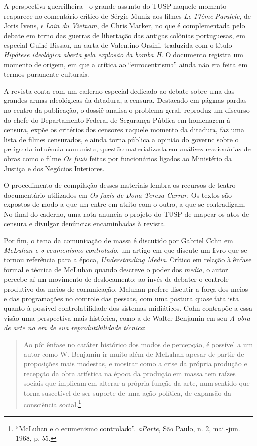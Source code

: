 A perspectiva guerrilheira - o grande assunto do TUSP naquele momento -
reaparece no comentário crítico de Sérgio Muniz aos filmes \textit{Le 17ème
Paralele}, de Joris Ivens, e \textit{Loin du Vietnam}, de Chris Marker, no
que é complementada pelo debate em torno das guerras de libertação das
antigas colônias portuguesas, em especial Guiné Bissau, na carta de
Valentino Orsini, traduzida com o título \textit{Hipótese ideológica aberta
pela explosão da bomba H}. O documento registra um momento de origem, em
que a crítica ao “eurocentrismo” ainda não era feita em termos puramente
culturais.

A revista conta com um caderno especial dedicado ao debate sobre uma das
grandes armas ideológicas da ditadura, a censura. Destacado em páginas
pardas no centro da publicação, o dossiê analisa o problema geral,
reproduz um discurso do chefe do Departamento Federal de Segurança
Pública em homenagem à censura, expõe os critérios dos censores naquele
momento da ditadura, faz uma lista de filmes censurados, e ainda torna
pública a opinião do governo sobre o perigo da influência comunista,
questão materializada em análises reacionárias de obras como o filme
\textit{Os fuzis} feitas por funcionários ligados ao Ministério da Justiça
e dos Negócios Interiores.

O procedimento de compilação desses materiais lembra os recursos de
teatro documentário utilizados em \textit{Os fuzis de Dona Tereza Carrar}.
Os textos são expostos de modo a que um entre em atrito com o outro, a
que se contradigam. No final do caderno, uma nota anuncia o projeto do
TUSP de mapear os atos de censura e divulgar denúncias encaminhadas à
revista.

Por fim, o tema da comunicação de massa é discutido por Gabriel Cohn em
\textit{McLuhan e o ecumenismo controlado}, um artigo em que discute um
livro que se tornou referência para a época, \textit{Understanding Media}.
Crítico em relação à ênfase formal e técnica de McLuhan quando descreve
o poder dos \textit{media}, o autor percebe aí um movimento de
deslocamento: ao invés de debater o controle produtivo dos meios de
comunicação, Mcluhan prefere discutir a força dos meios e das
programações no controle das pessoas, com uma postura quase fatalista
quanto à possível controlabilidade dos sistemas midiáticos. Cohn
contrapõe a essa visão uma perspectiva mais histórica, como a de Walter
Benjamin em seu \textit{A obra de arte na era de sua reprodutibilidade
técnica}:

\begin{quote}
Ao pôr ênfase no caráter histórico dos modos de percepção, é possível a
um autor como W. Benjamin ir muito além de McLuhan apesar de partir de
proposições mais modestas, e mostrar como a crise da própria produção e
recepção da obra artística na época da produção em massa tem raízes
sociais que implicam em alterar a própria função da arte, num sentido
que torna suscetível de ser suporte de uma ação política, de expansão da
consciência social.\footnote{“McLuhan e o ecumenismo controlado”.
  \textit{aParte}, São Paulo, n. 2, mai.-jun. 1968, p. 55.}
\end{quote}

